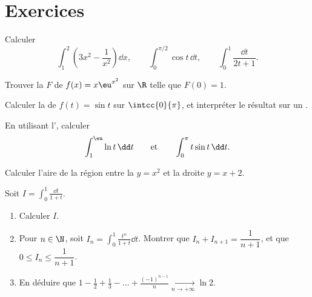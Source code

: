 \section{Exercices}

\begin{exercise}[$\star$]\label{exo:g12:integ:1}
Calculer
\[
\int_1^2 \left(3x^2 - \frac{1}{x^2}\right)\dd x, \qquad
\int_0^{\pi/2} \cos t \,\dd t, \qquad
\int_0^{1} \frac{\dd t}{2t+1} .
\]
\end{exercise}

\begin{exercise}[$\star$]\label{exo:g12:integ:2}
Trouver la  $F$ de $f(x) = x\eu^{x^2}$ sur $\R$ telle que
$F(0) = 1$.
\end{exercise}

\begin{exercise}[$\star$]\label{exo:g12:integ:3}
Calculer la  de $f(t) = \sin t$ sur $\intcc{0}{\pi}$, et
interpréter le résultat sur un .
\end{exercise}

\begin{exercise}[$\star\star$]\label{exo:g12:integ:4}
En utilisant l', calculer
\[
\int_1^{\eu} \ln t\,\dd t
\qquad\text{et}\qquad
\int_0^{\pi} t \sin t\,\dd t .
\]
\end{exercise}

\begin{exercise}[$\star\star$]\label{exo:g12:integ:5}
Calculer l'aire de la région entre la  $y = x^2$ et la droite
$y = x + 2$.
\end{exercise}

\begin{exercise}[$\star\star$]\label{exo:g12:integ:6}
Soit $I = \displaystyle\int_0^1 \frac{\dd t}{1 + t}$.
\begin{enumerate}
  \item Calculer $I$.
  \item Pour $n \in \N$, soit
        $I_n = \displaystyle\int_0^1 \frac{t^n}{1+t}\dd t$. Montrer que
        $I_n + I_{n+1} = \dfrac{1}{n+1}$, et que
        $0 \leq I_n \leq \dfrac{1}{n+1}$.
  \item En déduire que
        $1 - \frac12 + \frac13 - \dots + \frac{(-1)^{n-1}}{n}
        \xrightarrow[n \to +\infty]{} \ln 2$.
\end{enumerate}
\end{exercise}

